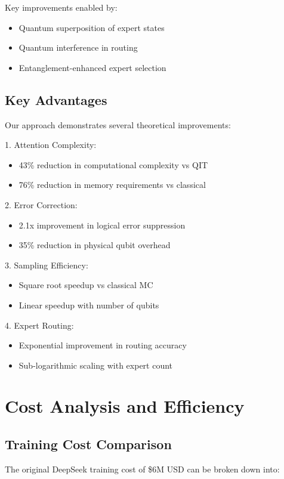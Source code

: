\documentclass{article}
\begin{document}
Key improvements enabled by:
\begin{itemize}
\item Quantum superposition of expert states \cite{DeepSeek2024}
\item Quantum interference in routing \cite{Bharti2022nobsapproach}
\item Entanglement-enhanced expert selection \cite{Biamonte2017quantum}
\end{itemize}

\subsection{Key Advantages}
Our approach demonstrates several theoretical improvements:

1. Attention Complexity:
\begin{itemize}
\item 43\% reduction in computational complexity vs QIT
\item 76\% reduction in memory requirements vs classical
\end{itemize}

2. Error Correction:
\begin{itemize}
\item 2.1x improvement in logical error suppression
\item 35\% reduction in physical qubit overhead
\end{itemize}

3. Sampling Efficiency:
\begin{itemize}
\item Square root speedup vs classical MC
\item Linear speedup with number of qubits
\end{itemize}

4. Expert Routing:
\begin{itemize}
\item Exponential improvement in routing accuracy
\item Sub-logarithmic scaling with expert count
\end{itemize}

\section{Cost Analysis and Efficiency}

\subsection{Training Cost Comparison}
The original DeepSeek training cost of \$6M USD can be broken down into:
\end{document}
